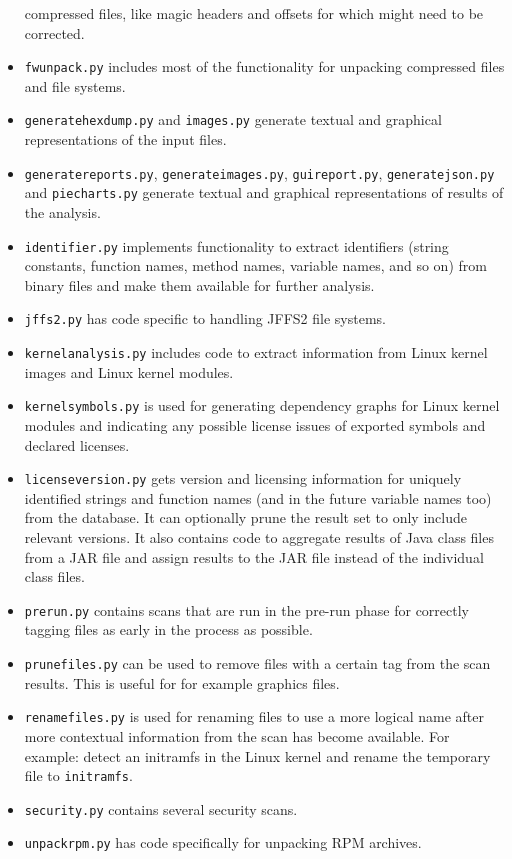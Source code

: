\documentclass[10pt,a4paper]{article}
\begin{document}
\begin{itemize}
compressed files, like magic headers and offsets for which might need to be
corrected.
\item \texttt{fwunpack.py} includes most of the functionality for unpacking
compressed files and file systems.
\item \texttt{generatehexdump.py} and \texttt{images.py} generate textual and
graphical representations of the input files.
\item \texttt{generatereports.py}, \texttt{generateimages.py},
\texttt{guireport.py}, \texttt{generatejson.py} and \texttt{piecharts.py}
generate textual and graphical representations of results of the analysis.
\item \texttt{identifier.py} implements functionality to extract identifiers
(string constants, function names, method names, variable names, and so on)
from binary files and make them available for further analysis.
\item \texttt{jffs2.py} has code specific to handling JFFS2 file systems.
\item \texttt{kernelanalysis.py} includes code to extract information from
Linux kernel images and Linux kernel modules.
\item \texttt{kernelsymbols.py} is used for generating dependency graphs for
Linux kernel modules and indicating any possible license issues of exported
symbols and declared licenses.
\item \texttt{licenseversion.py} gets version and licensing information for
uniquely identified strings and function names (and in the future variable names
too) from the database. It can optionally prune the result set to only include
relevant versions. It also contains code to aggregate results of Java class
files from a JAR file and assign results to the JAR file instead of the
individual class files.
\item \texttt{prerun.py} contains scans that are run in the pre-run phase for
correctly tagging files as early in the process as possible.
\item \texttt{prunefiles.py} can be used to remove files with a certain tag
from the scan results. This is useful for for example graphics files.
\item \texttt{renamefiles.py} is used for renaming files to use a more logical
name after more contextual information from the scan has become available. For
example: detect an initramfs in the Linux kernel and rename the temporary file
to \texttt{initramfs}.
\item \texttt{security.py} contains several security scans.
\item \texttt{unpackrpm.py} has code specifically for unpacking RPM archives.
\end{itemize}
\end{document}
